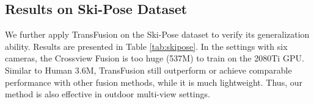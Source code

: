 \documentclass{bmvc2k}
\begin{document}
\vspace{-1.0em}
\subsection{Results on Ski-Pose Dataset}
\vspace{-0.7em}
We further apply TransFusion on the Ski-Pose dataset to verify its generalization ability. Results are presented in Table \ref{tab:skipose}. 
In the settings with six cameras, the Crossview Fusion is too huge (537M) to train on the 2080Ti GPU. Similar to Human 3.6M, TransFusion still outperform or achieve comparable performance with other fusion methods, while it is much lightweight.
Thus, our method is also effective in outdoor multi-view settings. 










\vspace{-1.0em}
\end{document}
